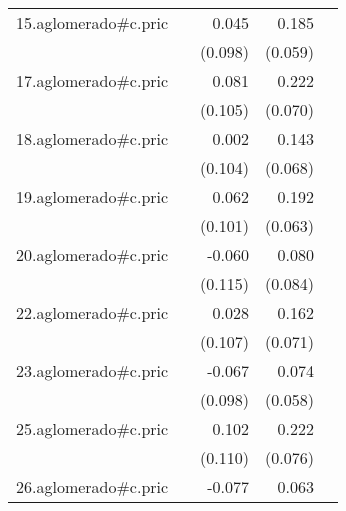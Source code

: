 {\begin{longtable}{l*{4}{D{.}{.}{-1}}}
\addlinespace
15.aglomerado#c.pric&                     &       0.045         &       0.185\sym{**} &                     \\
            &                     &     (0.098)         &     (0.059)         &                     \\
\addlinespace
17.aglomerado#c.pric&                     &       0.081         &       0.222\sym{**} &                     \\
            &                     &     (0.105)         &     (0.070)         &                     \\
\addlinespace
18.aglomerado#c.pric&                     &       0.002         &       0.143\sym{*}  &                     \\
            &                     &     (0.104)         &     (0.068)         &                     \\
\addlinespace
19.aglomerado#c.pric&                     &       0.062         &       0.192\sym{**} &                     \\
            &                     &     (0.101)         &     (0.063)         &                     \\
\addlinespace
20.aglomerado#c.pric&                     &      -0.060         &       0.080         &                     \\
            &                     &     (0.115)         &     (0.084)         &                     \\
\addlinespace
22.aglomerado#c.pric&                     &       0.028         &       0.162\sym{*}  &                     \\
            &                     &     (0.107)         &     (0.071)         &                     \\
\addlinespace
23.aglomerado#c.pric&                     &      -0.067         &       0.074         &                     \\
            &                     &     (0.098)         &     (0.058)         &                     \\
\addlinespace
25.aglomerado#c.pric&                     &       0.102         &       0.222\sym{**} &                     \\
            &                     &     (0.110)         &     (0.076)         &                     \\
\addlinespace
26.aglomerado#c.pric&                     &      -0.077         &       0.063         &                     \\

\end{longtable}}
